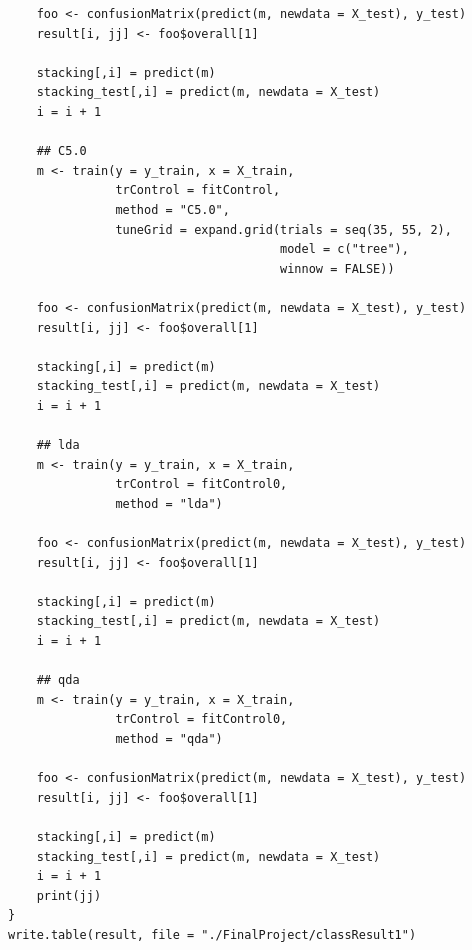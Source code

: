 \documentclass[11pt,oneside,a4paper]{article}
\begin{document}
\begin{verbatim}
    foo <- confusionMatrix(predict(m, newdata = X_test), y_test)
    result[i, jj] <- foo$overall[1]
    
    stacking[,i] = predict(m)
    stacking_test[,i] = predict(m, newdata = X_test)
    i = i + 1
    
    ## C5.0
    m <- train(y = y_train, x = X_train,
               trControl = fitControl,
               method = "C5.0", 
               tuneGrid = expand.grid(trials = seq(35, 55, 2), 
                                      model = c("tree"), 
                                      winnow = FALSE))
    
    foo <- confusionMatrix(predict(m, newdata = X_test), y_test)
    result[i, jj] <- foo$overall[1]
    
    stacking[,i] = predict(m)
    stacking_test[,i] = predict(m, newdata = X_test)
    i = i + 1
    
    ## lda
    m <- train(y = y_train, x = X_train,
               trControl = fitControl0,
               method = "lda")
    
    foo <- confusionMatrix(predict(m, newdata = X_test), y_test)
    result[i, jj] <- foo$overall[1]
    
    stacking[,i] = predict(m)
    stacking_test[,i] = predict(m, newdata = X_test)
    i = i + 1
    
    ## qda
    m <- train(y = y_train, x = X_train,
               trControl = fitControl0,
               method = "qda")
    
    foo <- confusionMatrix(predict(m, newdata = X_test), y_test)
    result[i, jj] <- foo$overall[1]
    
    stacking[,i] = predict(m)
    stacking_test[,i] = predict(m, newdata = X_test)
    i = i + 1
    print(jj)
}
write.table(result, file = "./FinalProject/classResult1")
\end{verbatim}
\end{document}
